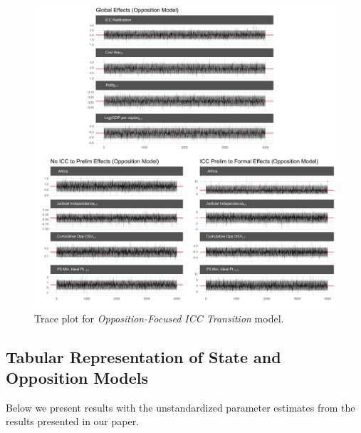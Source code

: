 \begin{figure}
    \centering
    \includegraphics[width=1\textwidth]{rebelCoefTrace.pdf}
    \caption{Trace plot for \emph{Opposition-Focused ICC Transition} model.}
    \label{fig:oppTrace}
\end{figure}
\FloatBarrier

\clearpage
\subsection*{Tabular Representation of State and Opposition Models}

Below we present results with the unstandardized parameter estimates from the results presented in our paper.

